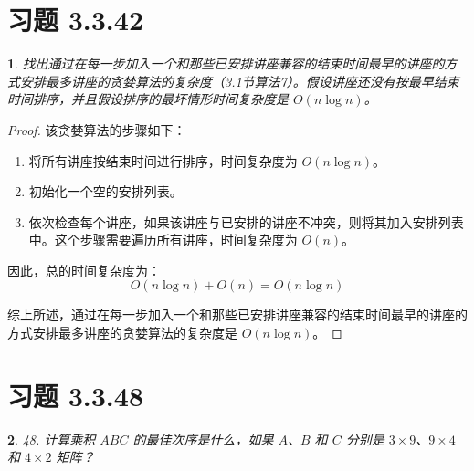 \documentclass[UTF8]{report}
\theoremstyle{MyLineTheoremStyle} %
\theoremstyle{MyBlockTheoremStyle} %
\theoremstyle{MySubsubsectionStyle} %
\newtheorem{definition}{}
\begin{document}
\section{习题 3.3.42}

\begin{definition}
    找出通过在每一步加入一个和那些已安排讲座兼容的结束时间最早的讲座的方式安排最多讲座的贪婪算法的复杂度（3.1节算法7）。假设讲座还没有按最早结束时间排序，并且假设排序的最坏情形时间复杂度是 \( O(n \log n) \)。
\end{definition}

\begin{proof}
    该贪婪算法的步骤如下：
    \begin{enumerate}
        \item 将所有讲座按结束时间进行排序，时间复杂度为 \( O(n \log n) \)。
        \item 初始化一个空的安排列表。
        \item 依次检查每个讲座，如果该讲座与已安排的讲座不冲突，则将其加入安排列表中。这个步骤需要遍历所有讲座，时间复杂度为 \( O(n) \)。
    \end{enumerate}

    因此，总的时间复杂度为：
    \[
    O(n \log n) + O(n) = O(n \log n)
    \]

    综上所述，通过在每一步加入一个和那些已安排讲座兼容的结束时间最早的讲座的方式安排最多讲座的贪婪算法的复杂度是 \( O(n \log n) \)。
\end{proof}

\section{习题 3.3.48}

\begin{definition}
    48. 计算乘积 \( ABC \) 的最佳次序是什么，如果 \( A \)、\( B \) 和 \( C \) 分别是 \( 3 \times 9 \)、\( 9 \times 4 \) 和 \( 4 \times 2 \) 矩阵？
\end{definition}
\end{document}
